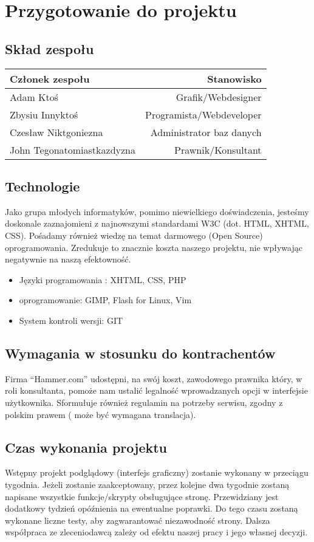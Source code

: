 \documentclass[10pt,a4paper]{article}
\begin{document}
\section{Przygotowanie do projektu}
\subsection{Skład zespołu}
\begin{center}
  \begin{tabular}{ | l | r | }
    \hline
    \textbf{ Członek zespołu} &\textbf{ Stanowisko} \\ \hline \hline
    Adam Ktoś & Grafik/Webdesigner \\  \hline
    Zbysiu Innyktoś & Programista/Webdeveloper \\ \hline
    Czesław Niktgoniezna & Administrator baz danych \\ \hline
    John Tegonatomiastkazdyzna & Prawnik/Konsultant \\ \hline
  \end{tabular}
\end{center}
\subsection{Technologie}
Jako grupa młodych informatyków, pomimo niewielkiego doświadczenia, jesteśmy doskonale zaznajomieni z najnowszymi  standardami W3C (dot. HTML, XHTML, CSS). Pośadamy również wiedzę na temat darmowego (Open Source) oprogramowania. Zredukuje to znacznie koszta naszego projektu, nie wpływając negatywnie na naszą efektowność.\\
\begin{itemize}
  \item Języki programowania : XHTML, CSS, PHP
  \item oprogramowanie: GIMP, Flash for Linux, Vim
  \item System kontroli wersji: GIT
\end{itemize}
\subsection{Wymagania w stosunku do kontrachentów}
Firma ``Hammer.com'' udostępni, na swój koszt, zawodowego prawnika który, w roli konsultanta, pomoże nam ustalić legalność wprowadzanych opcji w interfejsie użytkownika. Sformułuje również regulamin na potrzeby serwisu, zgodny z polskim prawem ( może być wymagana translacja).  
\subsection{Czas wykonania projektu}
Wstępny projekt podglądowy (interfejs graficzny) zostanie wykonany w przeciągu tygodnia. Jeżeli zostanie zaakceptowany, przez kolejne dwa tygodnie zostaną napisane wszystkie funkcje/skrypty obsługujące stronę. Przewidziany jest dodatkowy tydzień opóźnienia na ewentualne poprawki. Do tego czasu zostaną wykonane liczne testy, aby zagwarantować niezawodność strony. Dalsza współpraca ze zleceniodawcą zależy od efektu naszej pracy i jego własnej decyzji.
\end{document}
